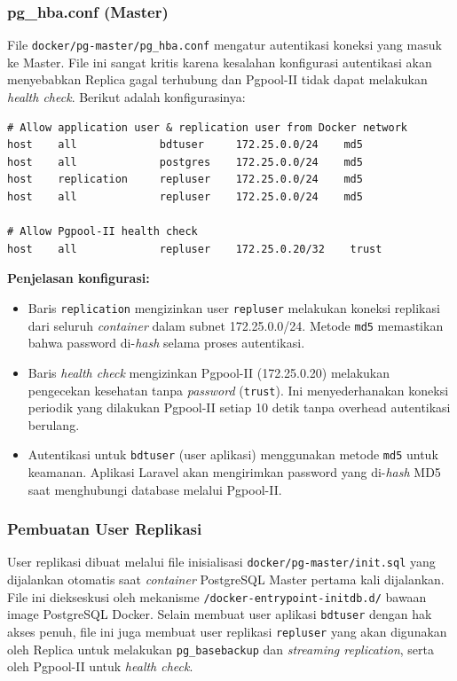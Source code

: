 \subsubsection{pg\_hba.conf (Master)}

File \texttt{docker/pg-master/pg\_hba.conf} mengatur autentikasi
koneksi yang masuk ke Master. File ini sangat kritis karena kesalahan
konfigurasi autentikasi akan menyebabkan Replica gagal terhubung dan
Pgpool-II tidak dapat melakukan \textit{health check}. Berikut adalah
konfigurasinya:

\begin{lstlisting}[caption={Konfigurasi pg\_hba.conf Master
(docker/pg-master/pg\_hba.conf)}, label={lst:master-hba}]
# Allow application user & replication user from Docker network
host    all             bdtuser     172.25.0.0/24    md5
host    all             postgres    172.25.0.0/24    md5
host    replication     repluser    172.25.0.0/24    md5
host    all             repluser    172.25.0.0/24    md5

# Allow Pgpool-II health check
host    all             repluser    172.25.0.20/32    trust
\end{lstlisting}

\textbf{Penjelasan konfigurasi:}
\begin{itemize}
    \item Baris \texttt{replication} mengizinkan user
    \texttt{repluser} melakukan koneksi replikasi dari seluruh
    \textit{container} dalam subnet 172.25.0.0/24. Metode
    \texttt{md5} memastikan bahwa password di-\textit{hash} selama
    proses autentikasi.
    \item Baris \textit{health check} mengizinkan Pgpool-II
    (172.25.0.20) melakukan pengecekan kesehatan tanpa
    \textit{password} (\texttt{trust}). Ini menyederhanakan koneksi
    periodik yang dilakukan Pgpool-II setiap 10 detik tanpa overhead
    autentikasi berulang.
    \item Autentikasi untuk \texttt{bdtuser} (user aplikasi)
    menggunakan metode \texttt{md5} untuk keamanan. Aplikasi Laravel
    akan mengirimkan password yang di-\textit{hash} MD5 saat
    menghubungi database melalui Pgpool-II.
\end{itemize}

\subsubsection{Pembuatan User Replikasi}

User replikasi dibuat melalui file inisialisasi
\texttt{docker/pg-master/init.sql} yang dijalankan otomatis saat
\textit{container} PostgreSQL Master pertama kali dijalankan. File ini
diekseskusi oleh mekanisme \texttt{/docker-entrypoint-initdb.d/}
bawaan image PostgreSQL Docker. Selain membuat user aplikasi
\texttt{bdtuser} dengan hak akses penuh, file ini juga membuat user
replikasi \texttt{repluser} yang akan digunakan oleh Replica untuk
melakukan \texttt{pg\_basebackup} dan \textit{streaming replication},
serta oleh Pgpool-II untuk \textit{health check}.

